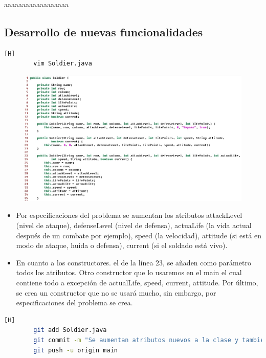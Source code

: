 \documentclass{article}
\begin{document}
	

aaaaaaaaaaaaaaaaaa	
	
	
	\subsection{Desarrollo de nuevas funcionalidades}
	
	\begin{lstlisting}[language=bash,caption={Se añaden atributos a la clase Soldier y se crean constructores }][H]
		vim Soldier.java
	\end{lstlisting}
	
	\begin{figure}[H]
		\centering
		\includegraphics[width=1\textwidth,keepaspectratio]{img/atributos.jpg}
	\end{figure}
	
	\begin{itemize}	
		\item Por especificaciones del problema se aumentan los atributos attackLevel (nivel de ataque), defenseLevel (nivel de defensa), actuaLife (la vida actual después de un combate por ejemplo), speed (la velocidad), attitude (si está en modo de ataque, huida o defensa), current (si el soldado está vivo).
		\item En cuanto a los constructores. el de la línea 23, se añaden como parámetro todos los atributos. Otro constructor que lo usaremos en el main el cual contiene todo a excepción de actualLife, speed, current, attitude. Por último, se crea un constructor que no se usará mucho, sin embargo, por especificaciones del problema se crea.
	\end{itemize}
	
	\begin{lstlisting}[language=bash,caption={Commit: 73ad0ec83d4c273a3169b0c15ec68c6e4dd9d2a2}][H]
		git add Soldier.java
		git commit -m "Se aumentan atributos nuevos a la clase y tambien los constructores"			
		git push -u origin main
	\end{lstlisting}
	
\end{document}
